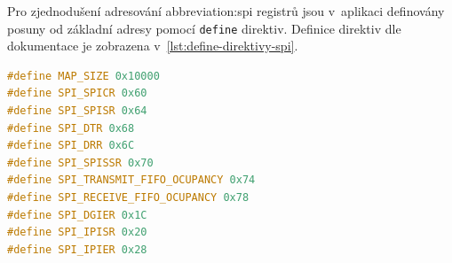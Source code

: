 \documentclass[a4paper, twoside, 11pt]{article}
\newcommand{\fbar}{\FloatBarrier}
\begin{document}
	Pro zjednodušení adresování \gls{abbreviation:spi} registrů jsou v~aplikaci definovány posuny od základní adresy pomocí \texttt{define} direktiv. Definice direktiv dle dokumentace \cite{axi-quad-spi-ip-product-guide} je zobrazena v~\ref{lst:define-direktivy-spi}.\par

	\fbar
	\begin{lstlisting}[language={c++}, caption={Definice posuvu adres pro registry \gls{abbreviation:axi} Quad \gls{abbreviation:spi} bloku pomocí define direktiv.}, label={lst:define-direktivy-spi}]
#define MAP_SIZE 0x10000
#define SPI_SPICR 0x60
#define SPI_SPISR 0x64
#define SPI_DTR 0x68
#define SPI_DRR 0x6C
#define SPI_SPISSR 0x70
#define SPI_TRANSMIT_FIFO_OCUPANCY 0x74
#define SPI_RECEIVE_FIFO_OCUPANCY 0x78
#define SPI_DGIER 0x1C
#define SPI_IPISR 0x20
#define SPI_IPIER 0x28\end{lstlisting}
\end{document}

